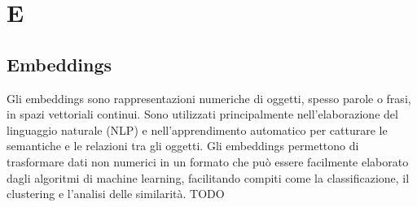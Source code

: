 \section{E}

\vspace{2em}
\subsection*{Embeddings}
Gli embeddings sono rappresentazioni numeriche di oggetti, spesso parole o frasi, in spazi vettoriali continui. Sono utilizzati principalmente nell'elaborazione del linguaggio naturale (NLP) e nell'apprendimento automatico per catturare le semantiche e le relazioni tra gli oggetti. Gli embeddings permettono di trasformare dati non numerici in un formato che può essere facilmente elaborato dagli algoritmi di machine learning, facilitando compiti come la classificazione, il clustering e l'analisi delle similarità.
TODO